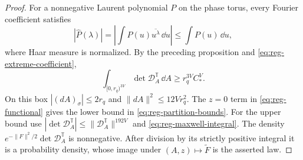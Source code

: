 \begin{proof}
For a nonnegative Laurent polynomial $P$ on the phase torus, every
Fourier coefficient satisfies
\[
 |\widehat P(\lambda)|
 =\left|\int P(u)\overline{u^\lambda}\,\dd u\right|
 \le\int P(u)\,\dd u,
\]
where Haar measure is normalized. By the preceding proposition and
\eqref{eq:reg-extreme-coefficient},
\[
 \int_{[0,r_q)^{3V}}\det \mathcal D_A^{\mathbb T}\,\dd A
 \ge r_q^{3V}C_*^V.
\]
On this box $|(dA)_\sigma|\le2r_q$ and
$\|dA\|^2\le12Vr_q^2$. The $z=0$ term in
\eqref{eq:reg-functional} gives the lower bound in
\eqref{eq:reg-partition-bounds}. For the upper bound use
$|\det \mathcal D_A^{\mathbb T}|\le\|\mathcal D_A^{\mathbb T}\|^{192V}$ and
\eqref{eq:reg-maxwell-integral}. The density
$e^{-\|F\|^2/2}\det \mathcal D_A^{\mathbb T}$ is nonnegative. After division
by its strictly positive integral it is a probability density, whose
image under $(A,z)\mapsto\widetilde F$ is the asserted law.
\end{proof}

